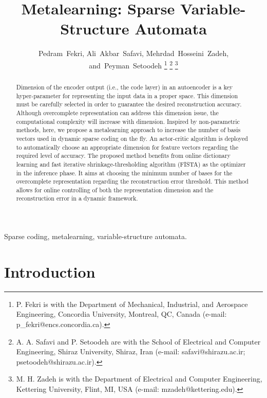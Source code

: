 \documentclass[journal]{IEEEtran}
\begin{document}
\title{Metalearning: Sparse Variable-Structure Automata}

\author{Pedram~Fekri, 
        Ali~Akbar~Safavi, 
        Mehrdad~Hosseini~Zadeh, 
        and~Peyman~Setoodeh
\thanks{P. Fekri is with the Department of Mechanical, Industrial, and Aerospace Engineering, Concordia University, Montreal, QC, Canada (e-mail: p\_fekri@encs.concordia.ca).}
\thanks{A. A. Safavi and P. Setoodeh are with the School of Electrical and Computer Engineering, Shiraz University, Shiraz,
Iran (e-mail: safavi@shirazu.ac.ir; psetoodeh@shirazu.ac.ir).}
\thanks{M. H. Zadeh is with the Department of Electrical and Computer Engineering, Kettering University, Flint, MI, USA (e-mail: mzadeh@kettering.edu).}
}


\maketitle

\begin{abstract}
Dimension of the encoder output (i.e., the code layer) in an autoencoder is a key hyper-parameter for representing the input data in a proper space. This dimension must be carefully selected in order to guarantee the desired reconstruction accuracy. Although overcomplete representation can address this dimension issue, the computational complexity will increase with dimension. Inspired by non-parametric methods, here, we propose a metalearning approach to increase the number of basis vectors used in dynamic sparse coding on the fly. An actor-critic algorithm is deployed to automatically choose an appropriate dimension for feature vectors regarding the required level of accuracy. The proposed method benefits from online dictionary learning and fast iterative shrinkage-thresholding algorithm (FISTA) as the optimizer in the inference phase. It aims at choosing the minimum number of bases for the overcomplete representation regarding the reconstruction error threshold. This method allows for online controlling of both the representation dimension and the reconstruction error in a dynamic framework.
\end{abstract}

\begin{IEEEkeywords}
Sparse coding, metalearning, variable-structure automata.
\end{IEEEkeywords}

\section{Introduction}
\label{intro}
\end{document}

